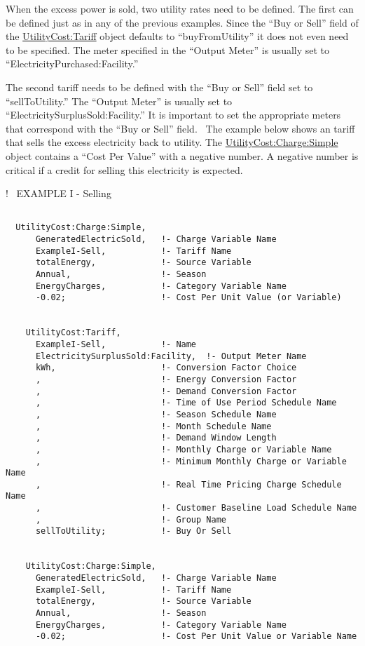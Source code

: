 When the excess power is sold, two utility rates need to be defined. The first can be defined just as in any of the previous examples. Since the ``Buy or Sell'' field of the \hyperref[utilitycosttariff]{UtilityCost:Tariff} object defaults to ``buyFromUtility'' it does not even need to be specified. The meter specified in the ``Output Meter'' is usually set to ``ElectricityPurchased:Facility.''

The second tariff needs to be defined with the ``Buy or Sell'' field set to ``sellToUtility.'' The ``Output Meter'' is usually set to ``ElectricitySurplusSold:Facility.'' It is important to set the appropriate meters that correspond with the ``Buy or Sell'' field.~ The example below shows an tariff that sells the excess electricity back to utility. The \hyperref[utilitycostchargesimple]{UtilityCost:Charge:Simple} object contains a ``Cost Per Value'' with a negative number. A negative number is critical if a credit for selling this electricity is expected.

!~ EXAMPLE I - Selling

\begin{lstlisting}

  UtilityCost:Charge:Simple,
      GeneratedElectricSold,   !- Charge Variable Name
      ExampleI-Sell,           !- Tariff Name
      totalEnergy,             !- Source Variable
      Annual,                  !- Season
      EnergyCharges,           !- Category Variable Name
      -0.02;                   !- Cost Per Unit Value (or Variable)


    UtilityCost:Tariff,
      ExampleI-Sell,           !- Name
      ElectricitySurplusSold:Facility,  !- Output Meter Name
      kWh,                     !- Conversion Factor Choice
      ,                        !- Energy Conversion Factor
      ,                        !- Demand Conversion Factor
      ,                        !- Time of Use Period Schedule Name
      ,                        !- Season Schedule Name
      ,                        !- Month Schedule Name
      ,                        !- Demand Window Length
      ,                        !- Monthly Charge or Variable Name
      ,                        !- Minimum Monthly Charge or Variable Name
      ,                        !- Real Time Pricing Charge Schedule Name
      ,                        !- Customer Baseline Load Schedule Name
      ,                        !- Group Name
      sellToUtility;           !- Buy Or Sell


    UtilityCost:Charge:Simple,
      GeneratedElectricSold,   !- Charge Variable Name
      ExampleI-Sell,           !- Tariff Name
      totalEnergy,             !- Source Variable
      Annual,                  !- Season
      EnergyCharges,           !- Category Variable Name
      -0.02;                   !- Cost Per Unit Value or Variable Name
\end{lstlisting}


